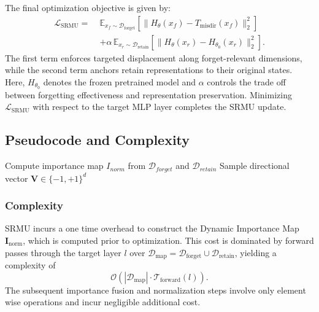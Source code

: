 The final optimization objective is given by:
\begin{equation}
\begin{aligned}
\mathcal{L}_{\text{SRMU}}
= \;&
\mathbb{E}_{x_f \sim \mathcal{D}_{\text{forget}}}
\left[
\| H_\theta(x_f) - T_{\text{misdir}}(x_f) \|_2^2
\right] \\
&+
\alpha \,
\mathbb{E}_{x_r \sim \mathcal{D}_{\text{retain}}}
\left[
\| H_\theta(x_r) - H_{\theta_0}(x_r) \|_2^2
\right].
\end{aligned}
\end{equation}
The first term enforces targeted displacement along forget-relevant dimensions,
while the second term anchors retain representations to their original states.
Here, $H_{\theta_0}$ denotes the frozen pretrained model and $\alpha$ controls the trade off between forgetting effectiveness and representation preservation.
Minimizing $\mathcal{L}_{\text{SRMU}}$ with respect to the target MLP layer completes the SRMU update.


\subsection{Pseudocode and Complexity}
\begin{algorithm}[H]
\caption{Selective Representation Misdirection for Unlearning (SRMU)}
\DontPrintSemicolon
{}

Compute importance map $I_{norm}$ from $\mathcal{D}_{forget}$ and $\mathcal{D}_{retain}$\;
Sample directional vector $\mathbf{V} \in \{-1,+1\}^d$\;


\end{algorithm}


\subsubsection{Complexity}
SRMU incurs a one time overhead to construct the Dynamic Importance Map $\mathbf{I}_{\text{norm}}$, which is computed prior to optimization.
This cost is dominated by forward passes through the target layer $l$ over $\mathcal{D}_{\text{map}} = \mathcal{D}_{\text{forget}} \cup \mathcal{D}_{\text{retain}}$, yielding a complexity of
\[
\mathcal{O}(|\mathcal{D}_{\text{map}}| \cdot \mathcal{T}_{\text{forward}}(l)).
\]
The subsequent importance fusion and normalization steps involve only element wise operations and incur negligible additional cost.

